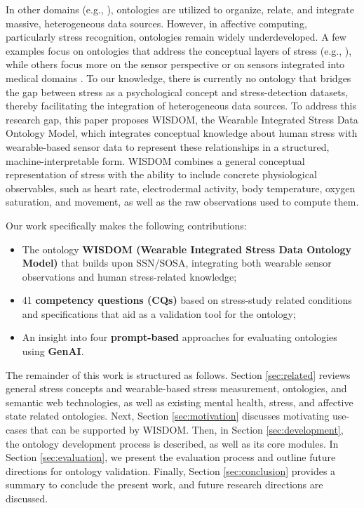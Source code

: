\documentclass[
]{ceurart}
\begin{document}
In other domains (e.g., \cite{burbach2025aiship,Chen2018,Thirumahal2022}), ontologies are utilized to organize, relate, and integrate massive, heterogeneous data sources. However, in affective computing, particularly stress recognition, ontologies remain widely underdeveloped. A few examples focus on ontologies that address the conceptual layers of stress (e.g., \cite{hadzic2008towards, khoozani2010designing}), while others focus more on the sensor perspective \cite{Janowicz2019,W3CSSNOntology} or on sensors integrated into medical domains \cite{lyons2021towards}. To our knowledge, there is currently no ontology that bridges the gap between stress as a psychological concept and stress-detection datasets, thereby facilitating the integration of heterogeneous data sources. To address this research gap, this paper proposes WISDOM, the Wearable Integrated Stress Data Ontology Model, which integrates conceptual knowledge about human stress with wearable-based sensor data to represent these relationships in a structured, machine-interpretable form. WISDOM combines a general conceptual representation of stress with the ability to include concrete physiological observables, such as heart rate, electrodermal activity, body temperature, oxygen saturation, and movement, as well as the raw observations used to compute them.

Our work specifically makes the following contributions:

\begin{itemize}
    \item The ontology \textbf{WISDOM (Wearable Integrated Stress Data Ontology Model)} that builds upon SSN/SOSA, integrating both wearable sensor observations and human stress-related knowledge;
    \item 41 \textbf{competency questions (CQs)} based on stress-study related conditions and specifications that aid as a validation tool for the ontology;
    \item An insight into four \textbf{prompt-based} approaches for evaluating ontologies using \textbf{GenAI}.
\end{itemize}

The remainder of this work is structured as follows. Section \ref{sec:related} reviews general stress concepts and wearable-based stress measurement, ontologies, and semantic web technologies, as well as existing mental health, stress, and affective state related ontologies. Next, Section \ref{sec:motivation} discusses motivating use-cases that can be supported by WISDOM. Then, in Section \ref{sec:development}, the ontology development process is described, as well as its core modules. In Section \ref{sec:evaluation}, we present the evaluation process and outline future directions for ontology validation. Finally, Section \ref{sec:conclusion} provides a summary to conclude the present work, and future research directions are discussed.
\end{document}
